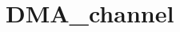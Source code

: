 \hypertarget{group___d_m_a__channel}{\section{D\-M\-A\-\_\-channel}
\label{group___d_m_a__channel}
}
